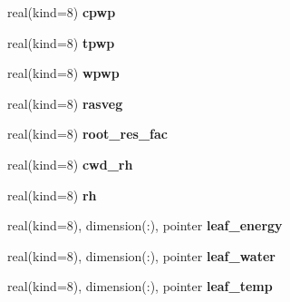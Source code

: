 \begin{DoxyCompactItemize}
\item 
\hypertarget{structrk4__coms_1_1rk4patchtype_a70eda468a5a061c5465e13483a1cb415}{
real(kind=8) {\bfseries cpwp}}
\label{structrk4__coms_1_1rk4patchtype_a70eda468a5a061c5465e13483a1cb415}

\item 
\hypertarget{structrk4__coms_1_1rk4patchtype_aabf358cc125a37721310b66fb1419d83}{
real(kind=8) {\bfseries tpwp}}
\label{structrk4__coms_1_1rk4patchtype_aabf358cc125a37721310b66fb1419d83}

\item 
\hypertarget{structrk4__coms_1_1rk4patchtype_a91728bf053cbc9d1a5e1b0d4e6624b64}{
real(kind=8) {\bfseries wpwp}}
\label{structrk4__coms_1_1rk4patchtype_a91728bf053cbc9d1a5e1b0d4e6624b64}

\item 
\hypertarget{structrk4__coms_1_1rk4patchtype_a3c1cfc91405c8ea9033a5978cb9fcc24}{
real(kind=8) {\bfseries rasveg}}
\label{structrk4__coms_1_1rk4patchtype_a3c1cfc91405c8ea9033a5978cb9fcc24}

\item 
\hypertarget{structrk4__coms_1_1rk4patchtype_ac5ef1027d0c6d201ebfa3d7730a1d5f8}{
real(kind=8) {\bfseries root\_\-res\_\-fac}}
\label{structrk4__coms_1_1rk4patchtype_ac5ef1027d0c6d201ebfa3d7730a1d5f8}

\item 
\hypertarget{structrk4__coms_1_1rk4patchtype_a6bb29c5eb04399802419b9b8aca23b74}{
real(kind=8) {\bfseries cwd\_\-rh}}
\label{structrk4__coms_1_1rk4patchtype_a6bb29c5eb04399802419b9b8aca23b74}

\item 
\hypertarget{structrk4__coms_1_1rk4patchtype_a00fd046c624cfb355879a826ce1f9dd7}{
real(kind=8) {\bfseries rh}}
\label{structrk4__coms_1_1rk4patchtype_a00fd046c624cfb355879a826ce1f9dd7}

\item 
\hypertarget{structrk4__coms_1_1rk4patchtype_af4f0514f78d66e1c8bafee25e1162ce7}{
real(kind=8), dimension(:), pointer {\bfseries leaf\_\-energy}}
\label{structrk4__coms_1_1rk4patchtype_af4f0514f78d66e1c8bafee25e1162ce7}

\item 
\hypertarget{structrk4__coms_1_1rk4patchtype_aa80fdd8785a6f4fe3408d0dad170d24d}{
real(kind=8), dimension(:), pointer {\bfseries leaf\_\-water}}
\label{structrk4__coms_1_1rk4patchtype_aa80fdd8785a6f4fe3408d0dad170d24d}

\item 
\hypertarget{structrk4__coms_1_1rk4patchtype_a85ee8c5e7a4e840610825359700fc5b9}{
real(kind=8), dimension(:), pointer {\bfseries leaf\_\-temp}}
\label{structrk4__coms_1_1rk4patchtype_a85ee8c5e7a4e840610825359700fc5b9}


\end{DoxyCompactItemize}

